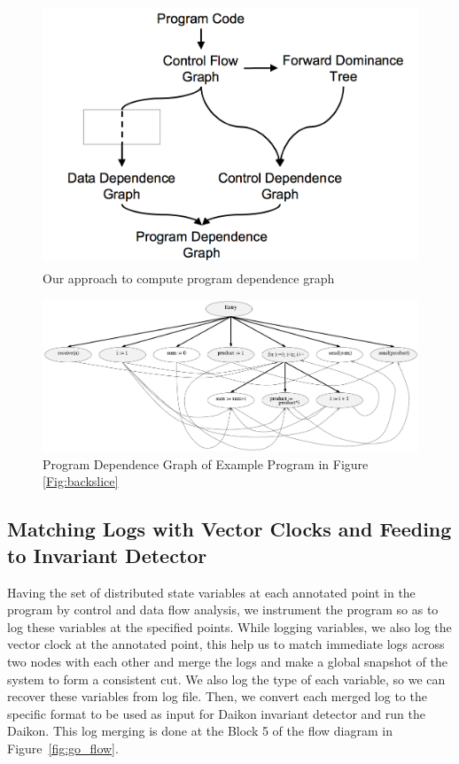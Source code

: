 \begin{figure}
\centering
  \includegraphics[scale=0.3]{images/PDG-approach.png}
  \caption{Our approach to compute program dependence graph}
  \label{fig:pdg}
\end{figure}


\begin{figure}
  \includegraphics[width=\columnwidth,scale=0.5]{images/pdg.png}
  \caption{Program Dependence Graph of Example Program in Figure \ref{Fig:backslice} \cite{Tip}}
  \label{fig:expdg}
\end{figure}


\subsection{Matching Logs with Vector Clocks and Feeding to Invariant Detector}

Having the set of distributed state variables at each annotated point in the program by control and data flow analysis, we instrument the program so as to log these variables at the specified points. While logging variables, we also log the vector clock at the annotated point, this help us to match immediate logs across two nodes with each other and merge the logs and make a global snapshot of the system to form a consistent cut. We also log the type of each variable, so we can recover these variables from log file. Then, we convert each merged log to the specific format to be used as input for Daikon invariant detector and run the Daikon. This log merging is done at the Block 5 of the flow diagram in Figure~\ref{fig:go_flow}.



